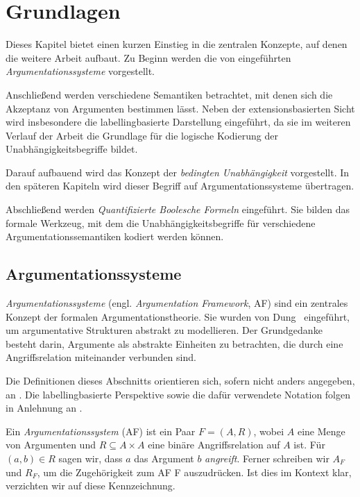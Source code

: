 \chapter{Grundlagen}
\label{ch:grundlagen}

Dieses Kapitel bietet einen kurzen Einstieg in die zentralen Konzepte, auf denen
die weitere Arbeit aufbaut. Zu Beginn werden die von \textcite{dung:1995:af}
eingeführten \emph{Argumentationssysteme} vorgestellt. 

Anschließend werden verschiedene Semantiken betrachtet, mit denen sich die
Akzeptanz von Argumenten bestimmen lässt. Neben der extensionsbasierten Sicht
wird insbesondere die labellingbasierte Darstellung eingeführt, da sie im
weiteren Verlauf der Arbeit die Grundlage für die logische Kodierung der
Unabhängigkeitsbegriffe bildet.

Darauf aufbauend wird das Konzept der \emph{bedingten Unabhängigkeit}
vorgestellt. In den späteren Kapiteln wird dieser Begriff auf
Argumentationssysteme übertragen.

Abschließend werden \emph{Quantifizierte Boolesche Formeln} eingeführt. Sie
bilden das formale Werkzeug, mit dem die Unabhängigkeitsbegriffe für 
verschiedene Argumentationssemantiken kodiert werden können.

\section{Argumentationssysteme}
\label{sec:af}

\emph{Argumentationssysteme} (engl. \emph{Argumentation Framework}, AF)
sind ein zentrales Konzept der formalen Argumentationstheorie. Sie wurden von
Dung~\cite{dung:1995:af} eingeführt, um argumentative Strukturen abstrakt zu
modellieren. Der Grundgedanke besteht darin, Argumente als abstrakte Einheiten
zu betrachten, die durch eine Angriffsrelation miteinander verbunden sind.

Die Definitionen dieses Abschnitts orientieren sich, sofern nicht
anders angegeben, an \textcite{handbook__of_formal_argumentation__vol__3:2024}.
Die labellingbasierte Perspektive sowie die dafür verwendete Notation folgen in
Anlehnung an \textcite{bluemel:2025:independence-aba}.

\begin{Definition}
    \label{def:af}
    Ein \emph{Argumentationssystem} (AF) ist ein Paar \(F=(A,R)\), wobei
    \(A\) eine Menge von Argumenten und
    \(R\subseteq A\times A\) eine binäre Angriffsrelation auf \(A\) ist.
    Für \((a,b)\in R\) sagen wir, dass \(a\) das Argument \(b\) \emph{angreift}.
    Ferner schreiben wir $A_F$ und $R_F$, um die Zugehörigkeit zum AF F auszudrücken.
    Ist dies im Kontext klar, verzichten wir auf diese Kennzeichnung. 
\end{Definition}

